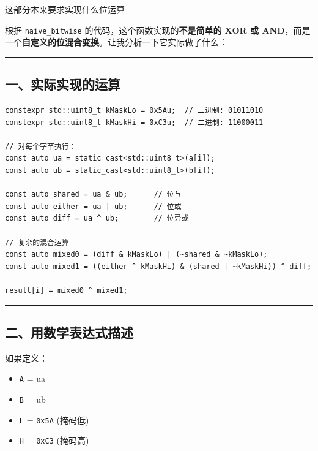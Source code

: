 \documentclass[11pt, a4paper]{article}
\begin{document}
\vspace{1.5em}

\begin{userbox}
这部分本来要求实现什么位运算
\end{userbox}

\begin{aibox}
根据 \texttt{naive\_bitwise} 的代码，这个函数实现的\textbf{不是简单的 XOR 或 AND}，而是一个\textbf{自定义的位混合变换}。让我分析一下它实际做了什么：

\begin{center}\rule{\textwidth}{0.4pt}\end{center}

\subsection*{一、实际实现的运算}

\begin{tcolorbox}[colback=white,colframe=gray!50!white,boxrule=0.5pt,arc=2pt,left=5pt,right=5pt,top=5pt,bottom=5pt]
\begin{verbatim}
constexpr std::uint8_t kMaskLo = 0x5Au;  // 二进制: 01011010
constexpr std::uint8_t kMaskHi = 0xC3u;  // 二进制: 11000011

// 对每个字节执行：
const auto ua = static_cast<std::uint8_t>(a[i]);
const auto ub = static_cast<std::uint8_t>(b[i]);

const auto shared = ua & ub;      // 位与
const auto either = ua | ub;      // 位或
const auto diff = ua ^ ub;        // 位异或

// 复杂的混合运算
const auto mixed0 = (diff & kMaskLo) | (~shared & ~kMaskLo);
const auto mixed1 = ((either ^ kMaskHi) & (shared | ~kMaskHi)) ^ diff;

result[i] = mixed0 ^ mixed1;
\end{verbatim}
\end{tcolorbox}

\begin{center}\rule{\textwidth}{0.4pt}\end{center}

\subsection*{二、用数学表达式描述}

如果定义：
\begin{itemize}
    \item \texttt{A} = ua
    \item \texttt{B} = ub
    \item \texttt{L} = \texttt{0x5A} (掩码低)
    \item \texttt{H} = \texttt{0xC3} (掩码高)
\end{itemize}


\end{aibox}
\end{document}
